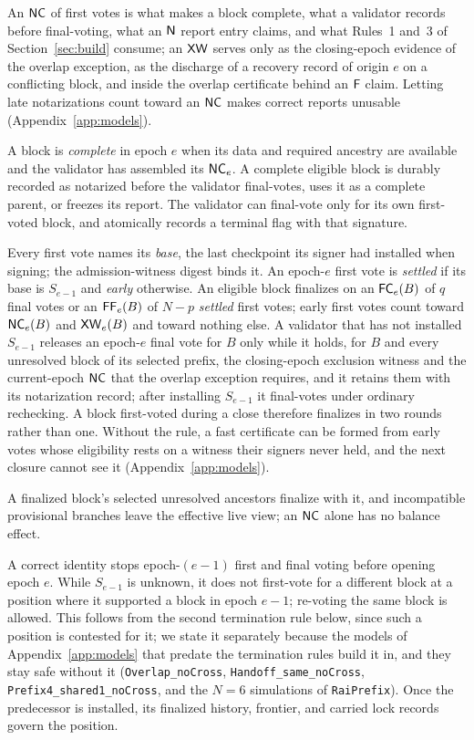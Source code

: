 An $\mathsf{NC}$ of first votes is what makes a block complete, what a validator records before final-voting, what an $\mathsf{N}$ report entry claims, and what Rules~1 and~3 of Section~\ref{sec:build} consume; an $\mathsf{XW}$ serves only as the closing-epoch evidence of the overlap exception, as the discharge of a recovery record of origin $e$ on a conflicting block, and inside the overlap certificate behind an $\mathsf{F}$ claim. Letting late notarizations count toward an $\mathsf{NC}$ makes correct reports unusable (Appendix~\ref{app:models}).

A block is \emph{complete} in epoch $e$ when its data and required ancestry are available and the validator has assembled its $\mathsf{NC}_e$. A complete eligible block is durably recorded as notarized before the validator final-votes, uses it as a complete parent, or freezes its report. The validator can final-vote only for its own first-voted block, and atomically records a terminal flag with that signature.

Every first vote names its \emph{base}, the last checkpoint its signer had installed when signing; the admission-witness digest binds it. An epoch-$e$ first vote is \emph{settled} if its base is $S_{e-1}$ and \emph{early} otherwise. An eligible block finalizes on an $\mathsf{FC}_e(B)$ of $q$ final votes or an $\mathsf{FF}_e(B)$ of $N-p$ \emph{settled} first votes; early first votes count toward $\mathsf{NC}_e(B)$ and $\mathsf{XW}_e(B)$ and toward nothing else. A validator that has not installed $S_{e-1}$ releases an epoch-$e$ final vote for $B$ only while it holds, for $B$ and every unresolved block of its selected prefix, the closing-epoch exclusion witness and the current-epoch $\mathsf{NC}$ that the overlap exception requires, and it retains them with its notarization record; after installing $S_{e-1}$ it final-votes under ordinary rechecking. A block first-voted during a close therefore finalizes in two rounds rather than one. Without the rule, a fast certificate can be formed from early votes whose eligibility rests on a witness their signers never held, and the next closure cannot see it (Appendix~\ref{app:models}).

A finalized block's selected unresolved ancestors finalize with it, and incompatible provisional branches leave the effective live view; an $\mathsf{NC}$ alone has no balance effect.

A correct identity stops epoch-$(e-1)$ first and final voting before opening epoch $e$. While $S_{e-1}$ is unknown, it does not first-vote for a different block at a position where it supported a block in epoch $e-1$; re-voting the same block is allowed. This follows from the second termination rule below, since such a position is contested for it; we state it separately because the models of Appendix~\ref{app:models} that predate the termination rules build it in, and they stay safe without it (\texttt{Overlap\_noCross}, \texttt{Handoff\_same\_noCross}, \texttt{Prefix4\_shared1\_noCross}, and the $N=6$ simulations of \texttt{RaiPrefix}). Once the predecessor is installed, its finalized history, frontier, and carried lock records govern the position.

